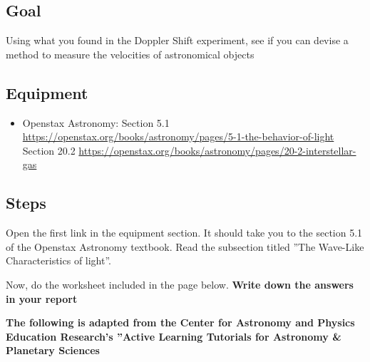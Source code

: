 \subsection{Goal}
Using what you found in the Doppler Shift experiment, see if you can devise a method to measure the velocities of astronomical objects

\subsection{Equipment}

\begin{itemize}
	\item Openstax Astronomy: Section 5.1 \url{https://openstax.org/books/astronomy/pages/5-1-the-behavior-of-light}
	Section 20.2 \url{https://openstax.org/books/astronomy/pages/20-2-interstellar-gas}
\end{itemize}

\subsection{Steps}
\begin{steps}
	\item Open the first link in the equipment section. It should take you to the section 5.1 of the Openstax Astronomy textbook. Read the subsection titled ''The Wave-Like Characteristics of light''. 
	
	\item Now, do the worksheet included in the page below. \textbf{Write down the answers in your report}
	
	\textbf{The following is adapted from the Center for Astronomy and Physics Education Research's ''Active Learning Tutorials for Astronomy & Planetary Sciences} %
\end{steps}
	



